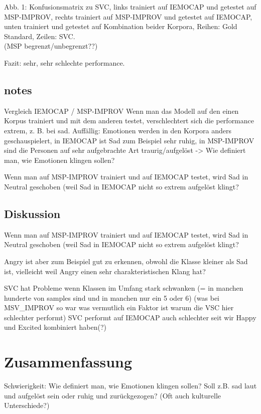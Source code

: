 \documentclass{article} %
\begin{document}
Abb. 1: Konfusionsmatrix zu SVC, links trainiert auf IEMOCAP und getestet auf MSP-IMPROV, rechts trainiert auf MSP-IMPROV und getestet auf IEMOCAP, unten trainiert und getestet auf Kombination beider Korpora, Reihen: Gold Standard, Zeilen: SVC. \\

(MSP begrenzt/unbegrenzt??)

Fazit: sehr, sehr schlechte performance. 

\subsection{notes}

Vergleich IEMOCAP / MSP-IMPROV
Wenn man das Modell auf den einen Korpus trainiert und mit dem anderen testet, verschlechtert sich die performance extrem, z. B. bei sad. Auffällig: Emotionen werden in den Korpora anders geschauspielert, in IEMOCAP ist Sad zum Beispiel sehr ruhig, in MSP-IMPROV sind die Personen auf sehr aufgebrachte Art traurig/aufgelöst
-> Wie definiert man, wie Emotionen klingen sollen?

Wenn man auf MSP-IMPROV trainiert und auf IEMOCAP testet, wird Sad in Neutral geschoben (weil Sad in IEMOCAP nicht so extrem aufgelöst klingt?

\subsection{Diskussion}

Wenn man auf MSP-IMPROV trainiert und auf IEMOCAP testet, wird Sad in Neutral geschoben (weil Sad in IEMOCAP nicht so extrem aufgelöst klingt?

Angry ist aber zum Beispiel gut zu erkennen, obwohl die Klasse kleiner als Sad ist, vielleicht weil Angry einen sehr charakteristischen Klang hat?

SVC hat Probleme wenn Klassen im Umfang stark schwanken (= in manchen hunderte von samples sind und in manchen nur ein 5 oder 6) (was bei MSV_IMPROV so war was vermutlich ein Faktor ist warum die VSC hier schlechter performt)
SVC performt auf IEMOCAP auch schlechter seit wir Happy und Excited kombiniert haben(?)

\section{Zusammenfassung}

Schwierigkeit: Wie definiert man, wie Emotionen klingen sollen? Soll z.B. sad laut und aufgelöst sein oder ruhig und zurückgezogen? (Oft auch kulturelle Unterschiede?)
\end{document}
